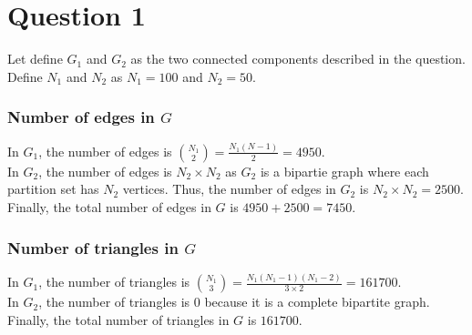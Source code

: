 \documentclass[a4paper]{article}
\begin{document}



\section*{Question 1}
Let define $G_1$ and $G_2$ as the two connected components
described in the question. Define $N_1$ and $N_2$ as $N_1 = 100$ and $N_2 = 50$.
\subsubsection*{Number of edges in $G$}
In $G_1$, the number of edges is $\binom{N_1}{2} = \frac{N_1(N-1)}{2} = 4950$.
\\
In $G_2$, the number of edges is $N_2 \times N_2$ as $G_2$ is a bipartie graph where
each partition set has $N_2$ vertices. Thus, the number of edges in $G_2$ is $N_2 \times N_2 = 2500$.
Finally, the total number of edges in $G$ is $4950 + 2500 = 7450$.

\subsubsection*{Number of triangles in $G$}
In $G_1$, the number of triangles is $\binom{N_1}{3} = \frac{N_1(N_1-1)(N_1-2)}{3\times2} = 161700$.
\\
In $G_2$, the number of triangles is $0$ because it is a complete bipartite graph.\\
Finally, the total number of triangles in $G$ is $161700$.
\end{document}
